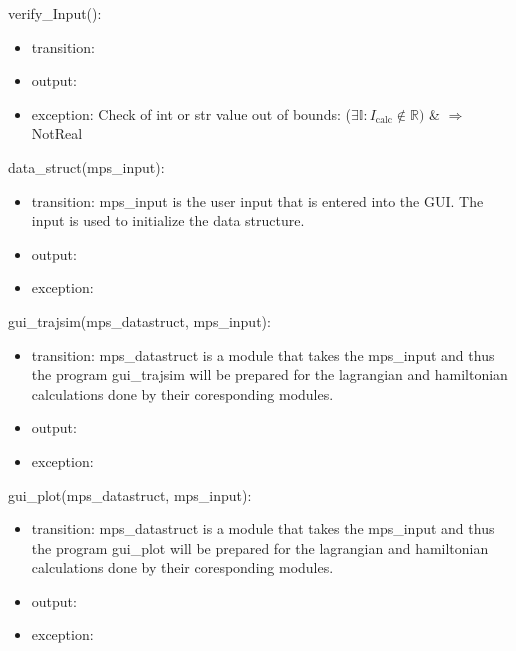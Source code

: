 \documentclass[12pt, titlepage]{article}
\begin{document}
\noindent verify\_Input():
\begin{itemize}
\item transition:  
\item output:  
\item exception: Check of int or str value out of bounds: 
($\exists \mathbb{I}:I_{\text{calc}} \notin \mathbb{R})$ \& $\Rightarrow$ NotReal\\
\end{itemize}

\noindent data\_struct(mps\_input):
\begin{itemize}
\item transition: mps\_input is the user input that is entered into the GUI. The input is used to initialize the data structure.
\item output:  
\item exception:  
\end{itemize}

\noindent gui\_trajsim(mps\_datastruct, mps\_input):
\begin{itemize}
\item transition: mps\_datastruct is a module that takes the mps\_input and thus the program gui\_trajsim will 
be prepared for the lagrangian and hamiltonian calculations done by their coresponding modules.
\item output:  
\item exception:  
\end{itemize}

\noindent gui\_plot(mps\_datastruct, mps\_input):
\begin{itemize}
\item transition: mps\_datastruct is a module that takes the mps\_input and thus the program gui\_plot will 
be prepared for the lagrangian and hamiltonian calculations done by their coresponding modules.
\item output:  
\item exception:  
\end{itemize}


\end{document}
